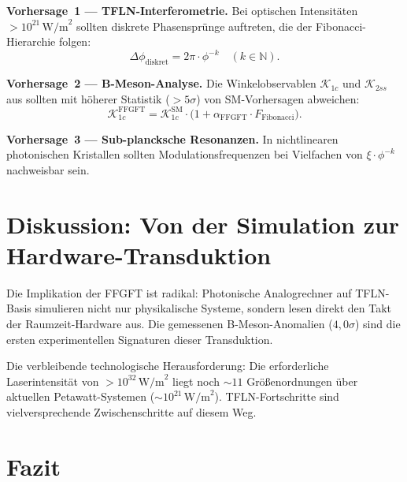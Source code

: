 \begin{predbox}
\textbf{Vorhersage~1 — TFLN-Interferometrie.}
Bei optischen Intensitäten $> 10^{21}\,\text{W/m}^2$ sollten diskrete
Phasensprünge auftreten, die der Fibonacci-Hierarchie folgen:
\[
  \Delta\phi_{\text{diskret}} = 2\pi \cdot \phi^{-k} \quad (k \in \mathbb{N}).
\]
\end{predbox}

\begin{predbox}
\textbf{Vorhersage~2 — B-Meson-Analyse.}
Die Winkelobservablen $\mathcal{K}_{1c}$ und $\mathcal{K}_{2ss}$ aus
\cite{Arslan2026} sollten mit höherer Statistik ($> 5\sigma$) von
SM-Vorhersagen abweichen:
\[
  \mathcal{K}_{1c}^{\text{FFGFT}}
  = \mathcal{K}_{1c}^{\text{SM}}
    \cdot \bigl(1 + \alpha_{\text{FFGFT}} \cdot F_{\text{Fibonacci}}\bigr).
\]
\end{predbox}

\begin{predbox}
\textbf{Vorhersage~3 — Sub-plancksche Resonanzen.}
In nichtlinearen photonischen Kristallen sollten Modulationsfrequenzen
bei Vielfachen von $\xi\cdot\phi^{-k}$ nachweisbar sein.
\end{predbox}

\section{Diskussion: Von der Simulation zur Hardware-Transduktion}

Die Implikation der FFGFT ist radikal: Photonische Analogrechner auf
TFLN-Basis simulieren nicht nur physikalische Systeme, sondern lesen direkt
den Takt der Raumzeit-Hardware aus. Die gemessenen B-Meson-Anomalien
($4{,}0\sigma$) sind die ersten experimentellen Signaturen dieser Transduktion.

Die verbleibende technologische Herausforderung: Die erforderliche
Laserintensität von $> 10^{32}\,\text{W/m}^2$ \cite{subPlanck2025} liegt
noch $\sim 11$ Größenordnungen über aktuellen Petawatt-Systemen
($\sim 10^{21}\,\text{W/m}^2$). TFLN-Fortschritte sind vielversprechende
Zwischenschritte auf diesem Weg.

\section{Fazit}


